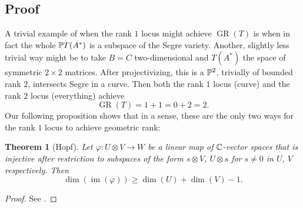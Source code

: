 \documentclass[a4paper,10pt]{article}
\let\phi\varphi
\DeclareMathOperator{\im}{im}
\DeclareMathOperator{\GR}{GR}
\newtheorem{theorem}{Theorem}
\theoremstyle{definition}
\theoremstyle{remark}
\begin{document}
\subsection{Proof}

A trivial example of when the rank $1$ locus might achieve $\GR(T)$ is when in fact the whole $\pe T(A^*)$ is a subspace of the Segre variety. Another, slightly less trivial way might be to take $B=C$ two-dimensional and $T(A^*)$ the space of symmetric $2\times2$ matrices. After projectivizing, this is a $\pe^2$, trivially of bounded rank $2$, intersects Segre in a curve. Then both the rank $1$ locus (curve) and the rank $2$ locus (everything) achieve
\[
    \GR(T) = 1+1 = 0+2 = 2.
\]
Our following proposition shows that in a sense, these are the only two ways for the rank $1$ locus to achieve geometric rank:

\begin{theorem}[Hopf]
    \label{thrm:hopf}
    Let $\phi: U \otimes V \to W$ be a linear map of $\ce$-vector spaces that is injective after restriction to subspaces of the form $s \otimes V$, $U \otimes s$ for $s\neq0$ in $U$, $V$ respectively. Then
    \[ \dim(\im(\phi)) \geq \dim(U) + \dim(V) -1. \]
\end{theorem}
\begin{proof}
    See \cite[Proposition 1.3]{smith}.
\end{proof}
\end{document}
